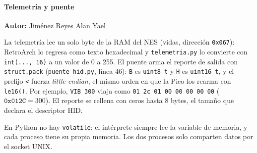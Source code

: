 \paragraph{Telemetría y puente}
\textbf{Autor:} Jiménez Reyes Alan Yael

La telemetría lee un solo byte de la RAM del NES (vidas, dirección \texttt{0x067}): RetroArch lo regresa como texto
hexadecimal y \texttt{telemetria.py} lo convierte con \texttt{int(..., 16)} a un valor de 0 a 255. El puente arma el
reporte de salida con \texttt{struct.pack} (\texttt{puente\_hid.py}, línea 46): \texttt{B} es \texttt{uint8\_t} y
\texttt{H} es \texttt{uint16\_t}, y el prefijo \texttt{<} fuerza \textit{little-endian}, el mismo orden en que la Pico
los rearma con \texttt{le16()}. Por ejemplo, \texttt{VIB 300} viaja como \texttt{01 2c 01 00 00 00 00 00}
($\texttt{0x012C} = 300$). El reporte se rellena con ceros hasta 8 bytes, el tamaño que declara el descriptor HID.

En Python no hay \texttt{volatile}: el intérprete siempre lee la variable de memoria, y cada proceso tiene su propia
memoria. Los dos procesos solo comparten datos por el socket UNIX.
